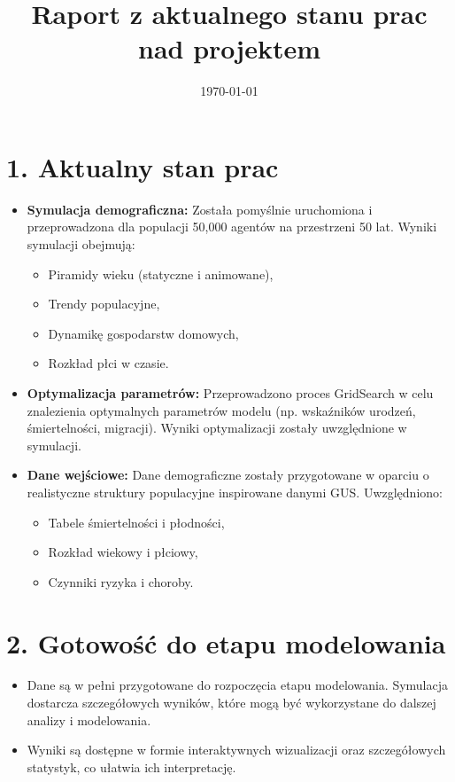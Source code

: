 \documentclass[a4paper,12pt]{article}
\title{Raport z aktualnego stanu prac nad projektem}
\author{}
\date{\today}
\begin{document}
\maketitle

\section*{1. Aktualny stan prac}
\begin{itemize}
    \item \textbf{Symulacja demograficzna:} Została pomyślnie uruchomiona i przeprowadzona dla populacji 50,000 agentów na przestrzeni 50 lat. Wyniki symulacji obejmują:
    \begin{itemize}
        \item Piramidy wieku (statyczne i animowane),
        \item Trendy populacyjne,
        \item Dynamikę gospodarstw domowych,
        \item Rozkład płci w czasie.
    \end{itemize}
    \item \textbf{Optymalizacja parametrów:} Przeprowadzono proces GridSearch w celu znalezienia optymalnych parametrów modelu (np. wskaźników urodzeń, śmiertelności, migracji). Wyniki optymalizacji zostały uwzględnione w symulacji.
    \item \textbf{Dane wejściowe:} Dane demograficzne zostały przygotowane w oparciu o realistyczne struktury populacyjne inspirowane danymi GUS. Uwzględniono:
    \begin{itemize}
        \item Tabele śmiertelności i płodności,
        \item Rozkład wiekowy i płciowy,
        \item Czynniki ryzyka i choroby.
    \end{itemize}
\end{itemize}

\section*{2. Gotowość do etapu modelowania}
\begin{itemize}
    \item Dane są w pełni przygotowane do rozpoczęcia etapu modelowania. Symulacja dostarcza szczegółowych wyników, które mogą być wykorzystane do dalszej analizy i modelowania.
    \item Wyniki są dostępne w formie interaktywnych wizualizacji oraz szczegółowych statystyk, co ułatwia ich interpretację.
\end{itemize}
\end{document}
